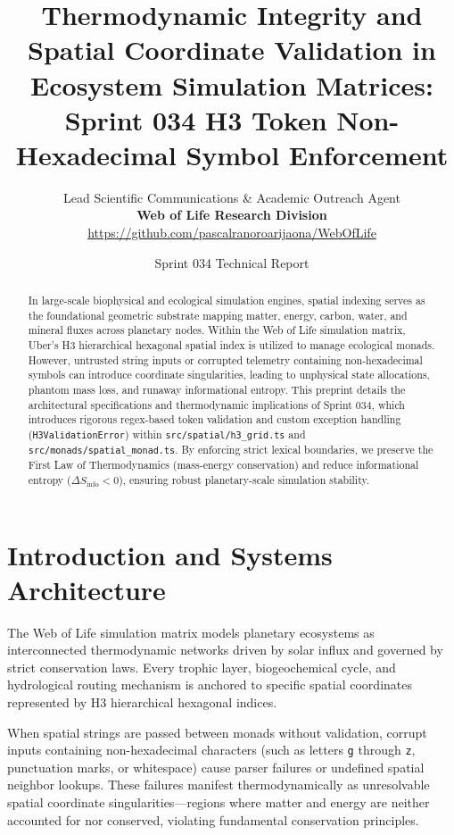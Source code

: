 \documentclass[11pt, a4paper]{article}
\title{\textbf{Thermodynamic Integrity and Spatial Coordinate Validation in Ecosystem Simulation Matrices: Sprint 034 H3 Token Non-Hexadecimal Symbol Enforcement}}
\author{Lead Scientific Communications \& Academic Outreach Agent \\ \textbf{Web of Life Research Division} \\ \url{https://github.com/pascalranoroarijaona/WebOfLife}}
\date{Sprint 034 Technical Report}
\begin{document}
\maketitle

\begin{abstract}
In large-scale biophysical and ecological simulation engines, spatial indexing serves as the foundational geometric substrate mapping matter, energy, carbon, water, and mineral fluxes across planetary nodes. Within the Web of Life simulation matrix, Uber's H3 hierarchical hexagonal spatial index is utilized to manage ecological monads. However, untrusted string inputs or corrupted telemetry containing non-hexadecimal symbols can introduce coordinate singularities, leading to unphysical state allocations, phantom mass loss, and runaway informational entropy. This preprint details the architectural specifications and thermodynamic implications of Sprint 034, which introduces rigorous regex-based token validation and custom exception handling (\texttt{H3ValidationError}) within \texttt{src/spatial/h3\_grid.ts} and \texttt{src/monads/spatial\_monad.ts}. By enforcing strict lexical boundaries, we preserve the First Law of Thermodynamics (mass-energy conservation) and reduce informational entropy ($\Delta S_{\text{info}} < 0$), ensuring robust planetary-scale simulation stability.
\end{abstract}

\section{Introduction and Systems Architecture}
The Web of Life simulation matrix models planetary ecosystems as interconnected thermodynamic networks driven by solar influx and governed by strict conservation laws. Every trophic layer, biogeochemical cycle, and hydrological routing mechanism is anchored to specific spatial coordinates represented by H3 hierarchical hexagonal indices.

When spatial strings are passed between monads without validation, corrupt inputs containing non-hexadecimal characters (such as letters \texttt{g} through \texttt{z}, punctuation marks, or whitespace) cause parser failures or undefined spatial neighbor lookups. These failures manifest thermodynamically as unresolvable spatial coordinate singularities---regions where matter and energy are neither accounted for nor conserved, violating fundamental conservation principles.
\end{document}
